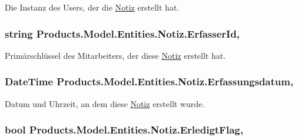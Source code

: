 Die Instanz des Users, der die \hyperlink{class_products_1_1_model_1_1_entities_1_1_notiz}{Notiz} erstellt hat. 

\subsubsection[{\texorpdfstring{Erfasser\+Id}{ErfasserId}}]{\setlength{\rightskip}{0pt plus 5cm}string Products.\+Model.\+Entities.\+Notiz.\+Erfasser\+Id\hspace{0.3cm}{\ttfamily [get]}, {\ttfamily [set]}}\hypertarget{class_products_1_1_model_1_1_entities_1_1_notiz_af7524a25e0f19c34bef9530f6cd01f7b}{}\label{class_products_1_1_model_1_1_entities_1_1_notiz_af7524a25e0f19c34bef9530f6cd01f7b}


Primärschlüssel des Mitarbeiters, der diese \hyperlink{class_products_1_1_model_1_1_entities_1_1_notiz}{Notiz} erstellt hat. 

\subsubsection[{\texorpdfstring{Erfassungsdatum}{Erfassungsdatum}}]{\setlength{\rightskip}{0pt plus 5cm}Date\+Time Products.\+Model.\+Entities.\+Notiz.\+Erfassungsdatum\hspace{0.3cm}{\ttfamily [get]}, {\ttfamily [set]}}\hypertarget{class_products_1_1_model_1_1_entities_1_1_notiz_af97261ebbaa09fe2e3d5741830c07569}{}\label{class_products_1_1_model_1_1_entities_1_1_notiz_af97261ebbaa09fe2e3d5741830c07569}


Datum und Uhrzeit, an dem diese \hyperlink{class_products_1_1_model_1_1_entities_1_1_notiz}{Notiz} erstellt wurde. 

\subsubsection[{\texorpdfstring{Erledigt\+Flag}{ErledigtFlag}}]{\setlength{\rightskip}{0pt plus 5cm}bool Products.\+Model.\+Entities.\+Notiz.\+Erledigt\+Flag\hspace{0.3cm}{\ttfamily [get]}, {\ttfamily [set]}}\hypertarget{class_products_1_1_model_1_1_entities_1_1_notiz_ade0317b474c065d96c400cc0d69c086f}{}\label{class_products_1_1_model_1_1_entities_1_1_notiz_ade0317b474c065d96c400cc0d69c086f}


